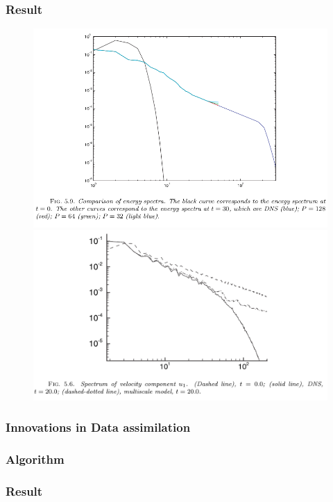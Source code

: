 \documentclass[aspectratio=169]{beamer}
\begin{document}
\begin{frame}[c]\frametitle{Result}
	\begin{figure}[!htb]
		\begin{minipage}{0.49\textwidth}
			\centering
			\includegraphics[width=1\linewidth]{Figures/spec1.png}
			
		\end{minipage}\hfill
		\begin{minipage}{0.49\textwidth}
			\centering
			\includegraphics[width=1\linewidth]{Figures/spec2.png}
			
		\end{minipage}
	\end{figure}
\end{frame}

\begin{frame}[c]\frametitle{Innovations in Data assimilation}
	
\end{frame}

\begin{frame}[c]\frametitle{Algorithm}
	
\end{frame}

\begin{frame}[c]\frametitle{Result}
	
\end{frame}




\end{document}
